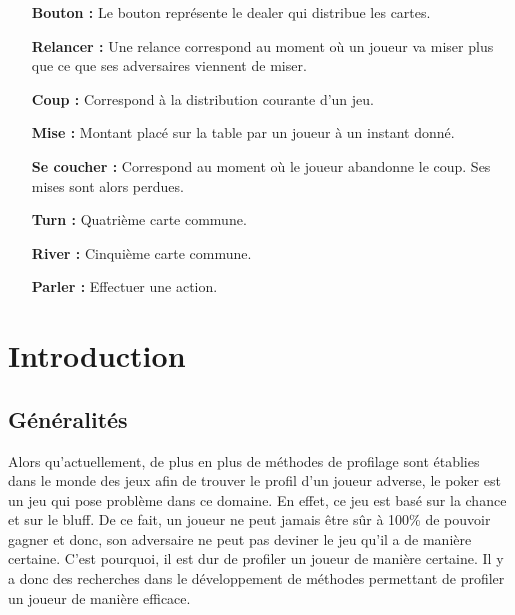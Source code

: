 \documentclass{report}
\begin{document}
\begin{itemize}
		\item[\textbf{Bouton : }]Le bouton représente le dealer qui distribue les cartes.\medskip
		
		\item[\textbf{Relancer : }]Une relance correspond au moment où un joueur va miser plus que ce que ses adversaires viennent de miser.\medskip
		
		\item[\textbf{Coup : }]Correspond à la distribution courante d'un jeu.\medskip
		
		\item[\textbf{Mise : }]Montant placé sur la table par un joueur à un instant donné.\medskip
		
		\item[\textbf{Se coucher : }]Correspond au moment où le joueur abandonne le coup. Ses mises sont alors perdues.\medskip
		
		\item[\textbf{Turn : }]Quatrième carte commune.\medskip
		
		\item[\textbf{River : }]Cinquième carte commune.\medskip
		
		\item[\textbf{Parler :}]Effectuer une action.\medskip
		
\end{itemize}



\chapter{Introduction}

\section{Généralités}
\hspace{0.5cm}Alors qu'actuellement, de plus en plus de méthodes de profilage sont établies dans le monde des jeux afin de trouver le profil d'un joueur adverse, le poker est un jeu qui pose problème dans ce domaine. En effet, ce jeu est basé sur la chance et sur le bluff. De ce fait, un joueur ne peut jamais être sûr à 100\% de pouvoir gagner et donc, son adversaire ne peut pas deviner le jeu qu'il a de manière certaine. C'est pourquoi, il est dur de profiler un joueur de manière certaine. Il y a donc des recherches dans le développement de méthodes permettant de profiler un joueur de manière efficace. \par
\end{document}
